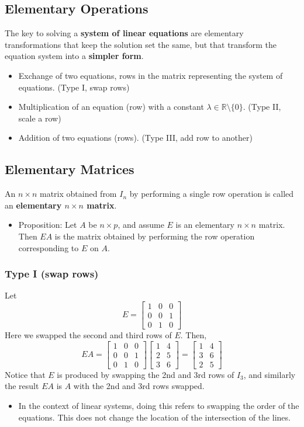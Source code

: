 \documentclass[10pt]{article}
\begin{document}
\subsection*{Elementary Operations}
The key to solving a \textbf{system of linear equations} are elementary transformations that keep the solution set the same, but that transform the equation system into a \textbf{simpler form}.
\begin{itemize}
	\item Exchange of two equations, rows in the matrix representing the system of equations.  (Type I, swap rows)
	\item Multiplication of an equation (row) with a constant $\lambda \in \mathbb{R} \setminus \{0\}$.  (Type II, scale a row)
	\item Addition of two equations (rows).  (Type III, add row to another)
\end{itemize}

\subsection*{Elementary Matrices}
An $n \times n$ matrix obtained from $I_n$ by performing a single row operation is called an \textbf{elementary $n \times n$ matrix}.
\begin{itemize}
	\item Proposition: Let $A$ be $n \times p$, and assume $E$ is an elementary $n \times n$ matrix.  Then $EA$ is the matrix obtained by performing the row operation corresponding to $E$ on $A$.
\end{itemize}

\subsubsection*{Type I (swap rows)}
Let
\[E = \begin{bmatrix} 1 & 0 & 0 \\ 0 & 0 & 1 \\ 0 & 1 & 0 \end{bmatrix}\]
Here we swapped the second and third rows of $E$.  Then,
\[EA = \begin{bmatrix} 1 & 0 & 0 \\ 0 & 0 & 1 \\ 0 & 1 & 0 \end{bmatrix} \begin{bmatrix} 1 & 4 \\ 2 & 5 \\ 3 & 6 \end{bmatrix} = \begin{bmatrix} 1 & 4 \\ 3 & 6 \\ 2 & 5 \end{bmatrix}\]
Notice that $E$ is produced by swapping the 2nd and 3rd rows of $I_3$, and similarly the result $EA$ is $A$ with the 2nd and 3rd rows swapped.
\begin{itemize}
	\item In the context of linear systems, doing this refers to swapping the order of the equations.  This does not change the location of the intersection of the lines.
\end{itemize}
\end{document}
